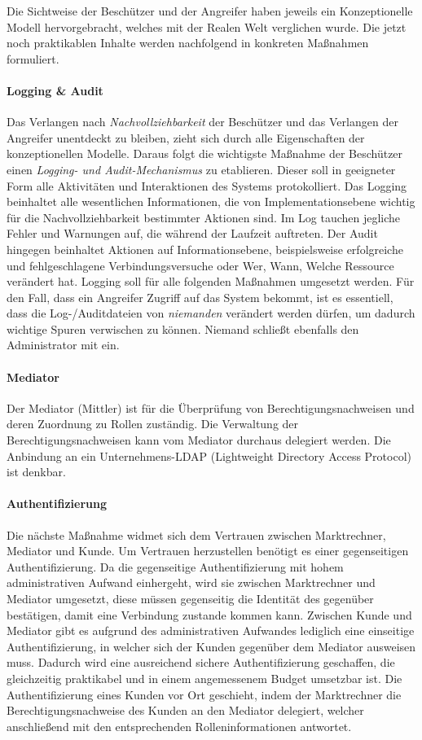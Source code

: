\documentclass[11pt,a4paper]{report}
\begin{document}
Die Sichtweise der Beschützer und der Angreifer haben jeweils ein Konzeptionelle Modell hervorgebracht, welches mit der Realen Welt verglichen wurde. Die jetzt noch praktikablen Inhalte werden nachfolgend in konkreten Maßnahmen formuliert. 

\paragraph{Logging \& Audit}
Das Verlangen nach \textit{Nachvollziehbarkeit} der Beschützer und das Verlangen der Angreifer unentdeckt zu bleiben, zieht sich durch alle Eigenschaften der konzeptionellen Modelle. Daraus folgt die wichtigste Maßnahme der Beschützer einen \textit{Logging- und Audit-Mechanismus} zu etablieren. Dieser soll in geeigneter Form alle Aktivitäten und Interaktionen des Systems protokolliert. Das Logging beinhaltet alle wesentlichen Informationen, die von Implementationsebene wichtig für die Nachvollziehbarkeit bestimmter Aktionen sind. Im Log tauchen jegliche Fehler und Warnungen auf, die während der Laufzeit auftreten. Der Audit hingegen beinhaltet Aktionen auf Informationsebene, beispielsweise erfolgreiche und fehlgeschlagene Verbindungsversuche oder Wer, Wann, Welche Ressource verändert hat. Logging soll für alle folgenden Maßnahmen umgesetzt werden. Für den Fall, dass ein Angreifer Zugriff auf das System bekommt, ist es essentiell, dass die Log-/Auditdateien von \textit{niemanden} verändert werden dürfen, um dadurch wichtige Spuren verwischen zu können. Niemand schließt ebenfalls den Administrator mit ein.

\paragraph{Mediator} 
Der Mediator (Mittler) ist für die Überprüfung von Berechtigungsnachweisen und deren Zuordnung zu Rollen zuständig. Die Verwaltung der Berechtigungsnachweisen kann vom Mediator durchaus delegiert werden. Die Anbindung an ein Unternehmens-LDAP (Lightweight Directory Access Protocol) ist denkbar. 

\paragraph{Authentifizierung} 
Die nächste Maßnahme widmet sich dem Vertrauen zwischen Marktrechner, Mediator und Kunde. Um Vertrauen herzustellen benötigt es einer gegenseitigen Authentifizierung. Da die gegenseitige Authentifizierung mit hohem administrativen Aufwand einhergeht, wird sie zwischen Marktrechner und Mediator umgesetzt, diese müssen gegenseitig die Identität des gegenüber bestätigen, damit eine Verbindung zustande kommen kann. Zwischen Kunde und Mediator gibt es aufgrund des administrativen Aufwandes lediglich eine einseitige Authentifizierung, in welcher sich der Kunden gegenüber dem Mediator ausweisen muss. Dadurch wird eine ausreichend sichere Authentifizierung geschaffen, die gleichzeitig praktikabel und in einem angemessenem Budget umsetzbar ist. Die Authentifizierung eines Kunden vor Ort geschieht, indem der Marktrechner die Berechtigungsnachweise des Kunden an den Mediator delegiert, welcher anschließend mit den entsprechenden Rolleninformationen antwortet.
\end{document}

